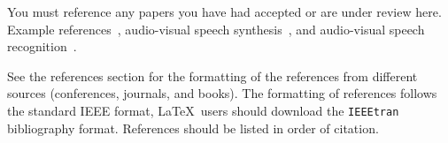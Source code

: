 \documentclass{cmppgr}
\begin{document}
You must reference any papers you have had accepted or are under review here. Example references~\cite{massaro98:perceiving}, audio-visual speech synthesis~\cite{theobald04:specomm,theobald08:lips}, and audio-visual speech recognition~\cite{cox08:avsp,matthews2002:extraction}.

See the references section for the formatting of the references from different sources (conferences, journals, and books). The formatting of references follows the standard IEEE format, \LaTeX\ users should download the \texttt{IEEEtran} bibliography format. References should be listed in order of citation.



\end{document}
